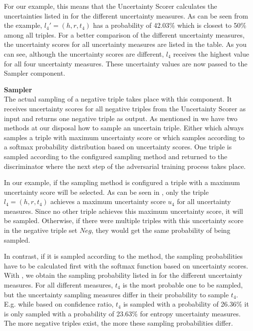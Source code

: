 
For our example, this means that the Uncertainty Scorer calculates the uncertainties listed in  for the different uncertainty measures.
As can be seen from the example, $l_4' = (h, r, t_4)$ has a probability of 42.03\% which is closest to 50\% among all triples.
For a better comparison of the different uncertainty measures, the uncertainty scores for all uncertainty measures are listed in the table.
As you can see, although the uncertainty scores are different, $l_4$ receives the highest value for all four uncertainty measures.
These uncertainty values are now passed to the Sampler component.

\textbf{Sampler} \\
The actual sampling of a negative triple takes place with this component.
It receives uncertainty scores for all negative triples from the Uncertainty Scorer as input and returns one negative triple as output.
As mentioned in  we have two methods at our disposal how to sample an uncertain triple.
Either \usmax which always samples a triple with maximum uncertainty score or \ussoftmax which samples according to a softmax probability distribution based on uncertainty scores.
One triple is sampled according to the configured sampling method and returned to the discriminator where the next step of the adversarial training process takes place.

In our example, if the \usmax sampling method is configured a triple with a maximum uncertainty score will be selected.
As can be seen in , only the triple $l_4 = (h,r,t_4)$ achieves a maximum uncertainty score $u_4$ for all uncertainty measures.
Since no other triple achieves this maximum uncertainty score, it will be sampled.
Otherwise, if there were multiple triples with this uncertainty score in the negative triple set $Neg$, they would get the same probability of being sampled.
\clearpage


In contrast, if it is sampled according to the \ussoftmax method, the sampling probabilities have to be calculated first with the softmax function based on uncertainty scores.
With , we obtain the sampling probability listed in  for the different uncertainty measures.
For all different measures, $t_4$ is the most probable one to be sampled, but the uncertainty sampling measures differ in their probability to sample $t_4$.
E.g. while based on confidence ratio, $t_4$ is sampled with a probability of 26.36\% it is only sampled with a probability of 23.63\% for entropy uncertainty measures.
The more negative triples exist, the more these sampling probabilities differ.
\clearpage
